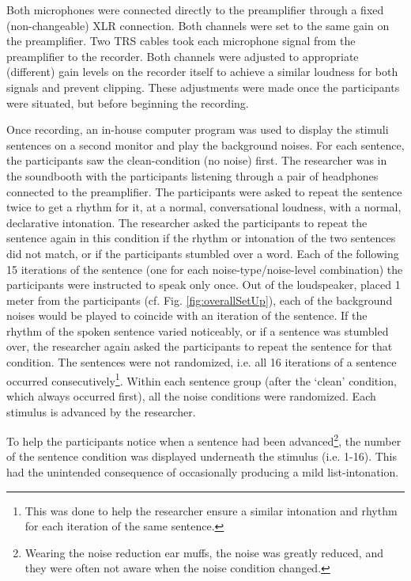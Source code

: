 \documentclass[dissertation,copyright]{uathesis}
\begin{document}
Both microphones were connected directly to the preamplifier through a fixed (non-changeable) XLR connection.  Both channels were set to the same gain on the preamplifier.  Two TRS cables took each microphone signal from the preamplifier to the recorder.  Both channels were adjusted to appropriate (different) gain levels on the recorder itself to achieve a similar loudness for both signals and prevent clipping.  These adjustments were made once the participants were situated, but before beginning the recording.

Once recording, an in-house computer program was used to display the stimuli sentences on a second monitor and play the background noises.  For each sentence, the participants saw the clean-condition (no noise) first.  The researcher was in the soundbooth with the participants listening through a pair of headphones connected to the preamplifier.  The participants were asked to repeat the sentence twice to get a rhythm for it, at a normal, conversational loudness, with a normal, declarative intonation.  The researcher asked the participants to repeat the sentence again in this condition if the rhythm or intonation of the two sentences did not match, or if the participants stumbled over a word.  Each of the following 15 iterations of the sentence (one for each noise-type/noise-level combination) the participants were instructed to speak only once.  Out of the loudspeaker, placed 1 meter from the participants (cf. Fig. \ref{fig:overallSetUp}), each of the background noises would be played to coincide with an iteration of the sentence.  If the rhythm of the spoken sentence varied noticeably, or if a sentence was stumbled over, the researcher again asked the participants to repeat the sentence for that condition.  The sentences were not randomized, i.e. all 16 iterations of a sentence occurred consecutively\footnote{This was done to help the researcher ensure a similar intonation and rhythm for each iteration of the same sentence.}. Within each sentence group (after the `clean' condition, which always occurred first), all the noise conditions were randomized. Each stimulus is advanced by the researcher.

To help the participants notice when a sentence had been advanced\footnote{Wearing the noise reduction ear muffs, the noise was greatly reduced, and they were often not aware when the noise condition changed.}, the number of the sentence condition was displayed underneath the stimulus (i.e. 1-16).  This had the unintended consequence of occasionally producing a mild list-intonation. 
\end{document}
